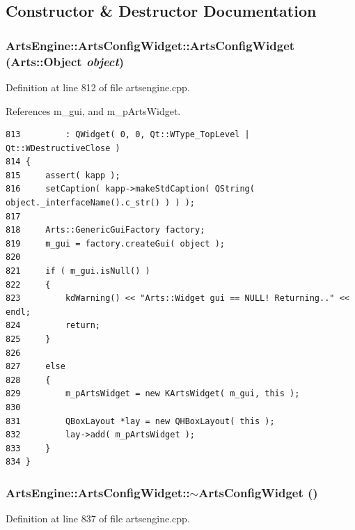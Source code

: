 \subsection{Constructor \& Destructor Documentation}
\subsubsection{\setlength{\rightskip}{0pt plus 5cm}Arts\-Engine::Arts\-Config\-Widget::Arts\-Config\-Widget (Arts::Object {\em object})}\label{classArtsEngine_1_1ArtsConfigWidget_ArtsEngine_1_1ArtsConfigWidgeta0}




Definition at line 812 of file artsengine.cpp.

References m\_\-gui, and m\_\-p\-Arts\-Widget.



\footnotesize\begin{verbatim}813         : QWidget( 0, 0, Qt::WType_TopLevel | Qt::WDestructiveClose )
814 {
815     assert( kapp );
816     setCaption( kapp->makeStdCaption( QString( object._interfaceName().c_str() ) ) );
817 
818     Arts::GenericGuiFactory factory;
819     m_gui = factory.createGui( object );
820 
821     if ( m_gui.isNull() )
822     {
823         kdWarning() << "Arts::Widget gui == NULL! Returning.." << endl;
824         return;
825     }
826 
827     else
828     {
829         m_pArtsWidget = new KArtsWidget( m_gui, this );
830 
831         QBoxLayout *lay = new QHBoxLayout( this );
832         lay->add( m_pArtsWidget );
833     }
834 }
\end{verbatim}\normalsize 
{}
\subsubsection{\setlength{\rightskip}{0pt plus 5cm}Arts\-Engine::Arts\-Config\-Widget::$\sim${\bf Arts\-Config\-Widget} ()}\label{classArtsEngine_1_1ArtsConfigWidget_ArtsEngine_1_1ArtsConfigWidgeta1}




Definition at line 837 of file artsengine.cpp.

